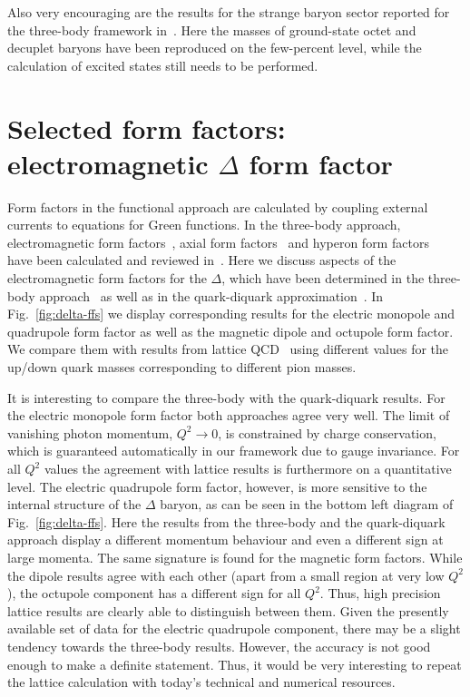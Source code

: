 \documentclass[epj,twocolumn]{webofc}
\begin{document}
Also very encouraging are the results for the strange baryon sector reported for the three-body framework in~\cite{Sanchis-Alepuz:2014sca}.
Here the masses of ground-state octet and decuplet baryons have been reproduced on the few-percent level, while the calculation
of excited states still needs to be performed.


\section{Selected form factors: electromagnetic $\Delta$ form factor}\label{sec-4}

Form factors in the functional approach are calculated by coupling external currents to equations for Green functions.
In the three-body approach, electromagnetic form factors~\cite{Eichmann:2011vu},
axial form factors~\cite{Eichmann:2011pv} and hyperon form factors~\cite{Sanchis-Alepuz:2015fcg} have been calculated and
reviewed in~\cite{Eichmann:2016yit}. Here we discuss aspects of the electromagnetic form factors for the $\Delta$, which have been
determined in the three-body approach~\cite{Sanchis-Alepuz:2013iia} as well as in the quark-diquark approximation~\cite{Nicmorus:2010sd}.
In Fig.~\ref{fig:delta-ffs} we display corresponding results for the electric monopole and quadrupole form factor as well as the magnetic dipole and octupole form factor.
We compare them with
results from lattice QCD~\cite{Alexandrou:2009hs} using different values for the up/down quark masses corresponding to different
pion masses.

It is interesting to compare the three-body with the quark-diquark results. For the
electric monopole form factor both approaches agree very well. The limit of vanishing photon momentum, $Q^2 \rightarrow 0$,
is constrained by charge conservation,
which is guaranteed automatically in our framework due to gauge invariance. For all $Q^2$ values the agreement with lattice
results is furthermore on a quantitative level. The electric quadrupole form factor, however, is more sensitive to the internal
structure of the $\Delta$ baryon, as can be seen in the bottom left diagram of Fig.~\ref{fig:delta-ffs}. Here the results from the
three-body and the quark-diquark approach display a different momentum behaviour and even a different sign at large momenta.
The same signature is found for the magnetic form factors. While the dipole results agree with each other (apart from a small
region at very low $Q^2$), the octupole component has a different sign for all $Q^2$.
Thus, high precision lattice results are clearly able to distinguish between them. Given the presently available set of data
for the electric quadrupole component,
there may be a slight tendency towards the three-body results. However, the accuracy is not good enough to make a definite statement.
Thus, it would be very interesting to repeat the lattice calculation with today's technical and numerical resources.
\end{document}
